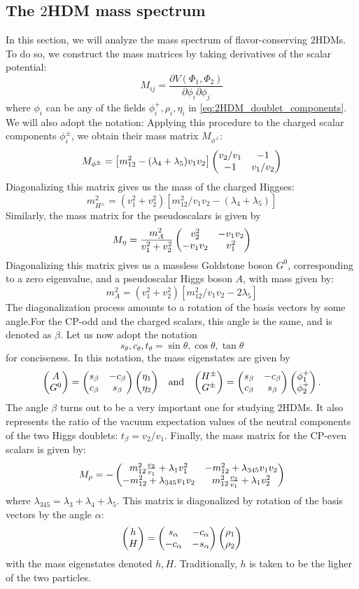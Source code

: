 \subsection{The $2$HDM mass spectrum}

In this section, we will analyze the mass spectrum of flavor-conserving $2$HDMs. To do so, we construct the mass matrices by taking derivatives of the scalar potential:
\[M_{ij} = \frac{\partial V(\Phi_1,\Phi_2)}{\partial\phi_i\partial\phi_j}\]
where $\phi_{i}$ can be any of the fields $\phi_i^+,\rho_i,\eta_i$ in \eqref{eq:2HDM_doublet_components}. We will also adopt the notation: 
Applying this procedure to the charged scalar components $\phi_i^\pm$, we obtain their mass matrix $M_{\phi^{\pm}}$:
\[M_{\phi^\pm} = \left[m_{12}^2-(\lambda_4+\lambda_5)v_1v_2\right]\begin{pmatrix} v_2/v_1 & -1 \\ -1 & v_1/v_2\end{pmatrix}\]
Diagonalizing this matrix gives us the mass of the charged Higgses:
\[m_{H^\pm}^2 = (v_1^2+v_2^2)[m_{12}^2/v_1v_2-(\lambda_4+\lambda_5)]\]
Similarly, the mass matrix for the pseudoscalars is given by
\[M_{\eta} = \frac{m_A^2}{v_1^2+v_2^2}\begin{pmatrix} v_2^2 & -v_1v_2 \\ -v_1v_2 & v_1^2\end{pmatrix}\]
Diagonalizing this matrix gives us a massless Goldstone boson $G^0$, corresponding to a zero eigenvalue, and a pseudoscalar Higgs boson $A$, with mass given by:
\[m_A^2 = (v_1^2+v_2^2)[m_{12}^2/v_1v_2-2\lambda_5]\]
The diagonalization process amounts to a rotation of the basis vectors by some angle.For the CP-odd and the charged scalars, this angle is the same, and is denoted as $\beta$. Let us now adopt the notation 
\[s_\theta,c_\theta,t_\theta = \sin\theta,\cos\theta,\tan\theta\]
for conciseness. In this notation, the mass eigenstates are given by
\begin{align}
\begin{pmatrix} A \\ G^0\end{pmatrix} = \begin{pmatrix} s_\beta & -c_\beta \\ c_\beta & s_\beta\end{pmatrix}\begin{pmatrix} \eta_1 \\ \eta_2\end{pmatrix}&&\text{and}&&
\begin{pmatrix} H^\pm \\ G^\pm\end{pmatrix} = \begin{pmatrix} s_\beta & -c_\beta \\ c_\beta & s_\beta\end{pmatrix}\begin{pmatrix} \phi_1^+ \\ \phi_2^+\end{pmatrix}.
\end{align}
The angle $\beta$ turns out to be a very important one for studying $2$HDMs. It also represents the ratio of the vacuum expectation values of the neutral components of the two Higgs doublets: $t_\beta = v_2/v_1$.
Finally, the mass matrix for the CP-even scalars is given by:
\[M_{\rho} = -\begin{pmatrix} m_{12}^2\frac{v_2}{v_1}+\lambda_1v_1^2 & -m_{12}^2+\lambda_{345}v_1v_2 \\ -m_{12}^2+\lambda_{345}v_1v_2 & m_{12}^2\frac{v_2}{v_1}+\lambda_1v_2^2\end{pmatrix}\]
where $\lambda_{345} = \lambda_3+\lambda_4+\lambda_5$. This matrix is diagonalized by rotation of the basis vectors by the angle $\alpha$:
\[\begin{pmatrix} h \\ H\end{pmatrix} = \begin{pmatrix} s_\alpha & -c_\alpha \\ -c_\alpha & -s_\alpha\end{pmatrix}\begin{pmatrix} \rho_1 \\ \rho_2\end{pmatrix}\]
with the mass eigenstates denoted $h,H$. Traditionally, $h$ is taken to be the ligher of the two particles. 


